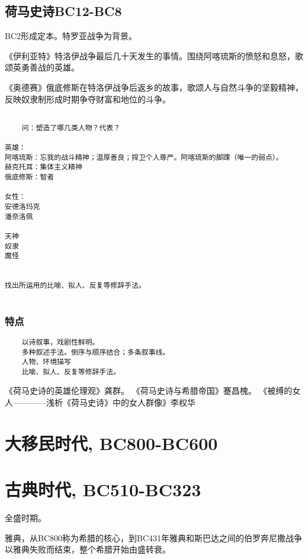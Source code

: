 \documentclass[UTF8]{../../RepresentationUniverse}
\begin{document}
\subsection{荷马史诗BC12-BC8}






BC2形成定本。特罗亚战争为背景。

《伊利亚特》特洛伊战争最后几十天发生的事情。围绕阿喀琉斯的愤怒和息怒，歌颂英勇善战的英雄。

《奥德赛》俄底修斯在特洛伊战争后返乡的故事，歌颂人与自然斗争的坚毅精神，反映奴隶制形成时期争夺财富和地位的斗争。




\begin{lstlisting}

    问：塑造了哪几类人物？代表？

英雄：
阿喀琉斯：忘我的战斗精神；温厚善良；捍卫个人尊严。阿喀琉斯的脚踝（唯一的弱点）。
赫克托耳：集体主义精神
俄底修斯：智者

女性：
安德洛玛克
潘奈洛佩

天神
奴隶
魔怪


找出所运用的比喻、拟人、反复等修辞手法。
    
\end{lstlisting}


\subsubsection{特点}
\begin{lstlisting}
    以诗叙事，戏剧性鲜明。
    多种叙述手法。倒序与顺序结合；多条叙事线。
    人物、环境描写
    比喻、拟人、反复等修辞手法。
\end{lstlisting}






《荷马史诗的英雄伦理观》龚群。
《荷马史诗与希腊帝国》蹇昌槐。
《被缚的女人————浅析《荷马史诗》中的女人群像》李权华


\section{大移民时代, BC800-BC600}

\section{古典时代, BC510-BC323}
全盛时期。

雅典，从BC800称为希腊的核心，到BC431年雅典和斯巴达之间的伯罗奔尼撒战争以雅典失败而结束，整个希腊开始由盛转衰。
\end{document}
